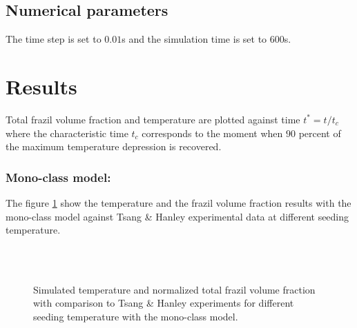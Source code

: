 \subsection{Numerical parameters}

The time step is set to $0.01$s and the simulation time is set to $600$s.

\section{Results}

Total frazil volume fraction and temperature are plotted against time $t^*=t/t_c$ 
where the characteristic time $t_c$ corresponds to the
moment when $90$ percent of the maximum temperature depression is recovered.

\subsubsection{Mono-class model:}

The figure \ref{fig:tsang_monoclass}
show the temperature and the frazil volume fraction results with the mono-class 
model against Tsang \& Hanley experimental data at different seeding temperature.

\begin{figure}[H]
    \begin{center}
        \\
        \\
    \end{center}
    \caption{Simulated temperature and normalized total frazil volume fraction with comparison to Tsang \& Hanley experiments for different seeding temperature with the mono-class model.}
    \label{fig:tsang_monoclass}
\end{figure}

